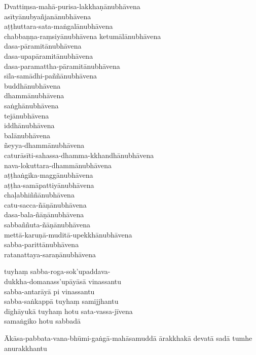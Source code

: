 Dvattiṃsa-mahā-purisa-lakkhaṇānubhāvena\\
asītyānubyañjanānubhāvena\\
aṭṭhuttara-sata-maṅgalānubhāvena\\
chabbaṇṇa-raṃsiyānubhāvena ketumālānubhāvena\\
dasa-pāramitānubhāvena\\
dasa-upapāramitānubhāvena\\
dasa-paramattha-pāramitānubhāvena\\
sīla-samādhi-paññānubhāvena\\
buddhānubhāvena\\
dhammānubhāvena\\
saṅghānubhāvena\\
tejānubhāvena\\
iddhānubhāvena\\
balānubhāvena\\
ñeyya-dhammānubhāvena\\
caturāsīti-sahassa-dhamma-kkhandhānubhāvena\\
nava-lokuttara-dhammānubhāvena\\
aṭṭhaṅgika-maggānubhāvena\\
aṭṭha-samāpattiyānubhāvena\\
chaḷabhiññānubhāvena\\
catu-sacca-ñāṇānubhāvena\\
dasa-bala-ñāṇānubhāvena\\
sabbaññuta-ñāṇānubhāvena\\
mettā-karuṇā-muditā-upekkhānubhāvena\\
sabba-parittānubhāvena\\
ratanattaya-saraṇānubhāvena

\clearpage

tuyhaṃ sabba-roga-sok'upaddava-\\ dukkha-domanass'upāyāsā vinassantu\\
sabba-antarāyā pi vinassantu\\
sabba-saṅkappā tuyhaṃ samijjhantu\\
dīghāyukā tuyhaṃ hotu sata-vassa-jīvena\\
samaṅgiko hotu sabbadā

Ākāsa-pabbata-vana-bhūmi-gaṅgā-mahāsamuddā ārakkhakā
devatā sadā tumhe anurakkhantu


